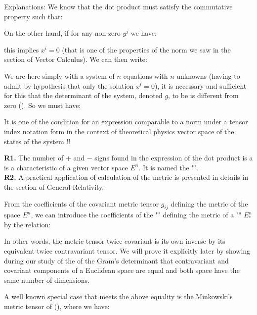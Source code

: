 	Explanations: We know that the dot product must satisfy the commutative property such that:
	
	On the other hand, if for any non-zero $y^j$ we have:
	
	this implies $x^i=0$ (that is one of the properties of the norm we saw in the section of Vector Calculus). We can then write:
	
	We are here simply with a system of $n$ equations with $n$ unknowns (having to admit by hypothesis that only the solution $x^i=0$), it is necessary and sufficient for this that the determinant of the system, denoted $g$, to be is different from zero (). So we must have:
	
	It is one of the condition for an expression comparable to a norm under a tensor index notation form in the context of theoretical physics vector space of the states of the system !!
	
	\begin{tcolorbox}[title=Remarks,colframe=black,arc=10pt]
	\textbf{R1.} The number of $+$ and $-$ signs found in the expression of the dot product is a is a characteristic of a given vector space $E^n$. It is named the "".\\
	
	\textbf{R2.} A practical application of calculation of the metric is presented in details in the section of General Relativity.\\
	\end{tcolorbox}
	From the coefficients of the covariant metric tensor $g_{ij}$ defining the metric of the space $E^n$, we can introduce the coefficients of the "" defining the metric of a "" $E_{*}^n$ by the relation:
	
	In other words, the metric tensor twice covariant is its own inverse by its equivalent twice contravariant tensor. We will prove it explicitly later by showing during our study of the of the Gram's determinant that contravariant and covariant components of a Euclidean space are equal and both space have the same number of dimensions.

	A well known special case that meets the above equality is the Minkowski's metric tensor of (), where we have:
	 
